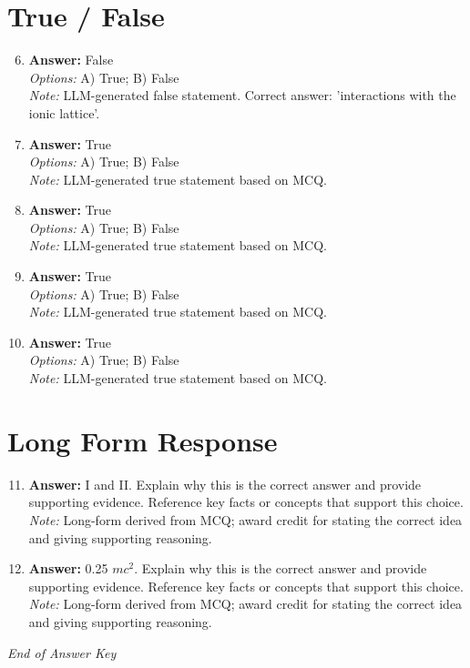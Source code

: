 \documentclass[12pt]{article}
\begin{document}
\section*{True / False}
\begin{enumerate}[label=\arabic*.]
\setcounter{enumi}{5}
\item \textbf{Answer:} False
\\ \textit{Options:} A) True; B) False
\\ \textit{Note:} LLM-generated false statement. Correct answer: 'interactions with the ionic lattice'.
\item \textbf{Answer:} True
\\ \textit{Options:} A) True; B) False
\\ \textit{Note:} LLM-generated true statement based on MCQ.
\item \textbf{Answer:} True
\\ \textit{Options:} A) True; B) False
\\ \textit{Note:} LLM-generated true statement based on MCQ.
\item \textbf{Answer:} True
\\ \textit{Options:} A) True; B) False
\\ \textit{Note:} LLM-generated true statement based on MCQ.
\item \textbf{Answer:} True
\\ \textit{Options:} A) True; B) False
\\ \textit{Note:} LLM-generated true statement based on MCQ.
\end{enumerate}

\section*{Long Form Response}
\begin{enumerate}[label=\arabic*.]
\setcounter{enumi}{10}
\item \textbf{Answer:} I and II. Explain why this is the correct answer and provide supporting evidence. Reference key facts or concepts that support this choice.
\\ \textit{Note:} Long-form derived from MCQ; award credit for stating the correct idea and giving supporting reasoning.
\item \textbf{Answer:} 0.25 $mc^2$. Explain why this is the correct answer and provide supporting evidence. Reference key facts or concepts that support this choice.
\\ \textit{Note:} Long-form derived from MCQ; award credit for stating the correct idea and giving supporting reasoning.
\end{enumerate}

\vfill
\noindent\textit{End of Answer Key}
\end{document}
